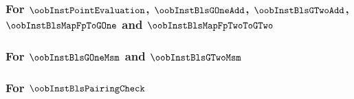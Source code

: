\subsubsection{For $\oobInstPointEvaluation$, $\oobInstBlsGOneAdd$, $\oobInstBlsGTwoAdd$,\\ $\oobInstBlsMapFpToGOne$ and $\oobInstBlsMapFpTwoToGTwo$}          \label{oob: precompiles: bls: fixed size and cost} \newpage
\subsubsection{For $\oobInstBlsGOneMsm$ and $\oobInstBlsGTwoMsm$}                                                                                 \label{oob: precompiles: bls: msm}                 \newpage
\subsubsection{For $\oobInstBlsPairingCheck$}                                                                                           \label{oob: precompiles: bls: pairing check}       \newpage